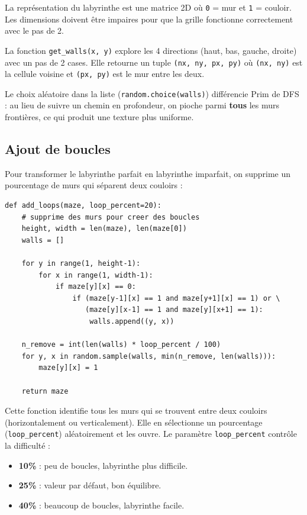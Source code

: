 \documentclass[12pt,a4paper]{article}
\begin{document}
La représentation du labyrinthe est une matrice 2D où \texttt{0} = mur et \texttt{1} = couloir. Les dimensions doivent être impaires pour que la grille fonctionne correctement avec le pas de 2.

La fonction \texttt{get\_walls(x, y)} explore les 4 directions (haut, bas, gauche, droite) avec un pas de 2 cases. Elle retourne un tuple \texttt{(nx, ny, px, py)} où \texttt{(nx, ny)} est la cellule voisine et \texttt{(px, py)} est le mur entre les deux.

Le choix aléatoire dans la liste (\texttt{random.choice(walls)}) différencie Prim de DFS : au lieu de suivre un chemin en profondeur, on pioche parmi \textbf{tous} les murs frontières, ce qui produit une texture plus uniforme.

\subsection{Ajout de boucles}

Pour transformer le labyrinthe parfait en labyrinthe imparfait, on supprime un pourcentage de murs qui séparent deux couloirs :

\begin{lstlisting}[caption={Ajout de boucles (\texttt{add\_loops})}]
def add_loops(maze, loop_percent=20):
    # supprime des murs pour creer des boucles
    height, width = len(maze), len(maze[0])
    walls = []
    
    for y in range(1, height-1):
        for x in range(1, width-1):
            if maze[y][x] == 0:
                if (maze[y-1][x] == 1 and maze[y+1][x] == 1) or \
                   (maze[y][x-1] == 1 and maze[y][x+1] == 1):
                    walls.append((y, x))
    
    n_remove = int(len(walls) * loop_percent / 100)
    for y, x in random.sample(walls, min(n_remove, len(walls))):
        maze[y][x] = 1
    
    return maze
\end{lstlisting}

Cette fonction identifie tous les murs qui se trouvent entre deux couloirs (horizontalement ou verticalement). Elle en sélectionne un pourcentage (\texttt{loop\_percent}) aléatoirement et les ouvre. Le paramètre \texttt{loop\_percent} contrôle la difficulté :
\begin{itemize}
    \item \textbf{10\%} : peu de boucles, labyrinthe plus difficile.
    \item \textbf{25\%} : valeur par défaut, bon équilibre.
    \item \textbf{40\%} : beaucoup de boucles, labyrinthe facile.
\end{itemize}
\end{document}
